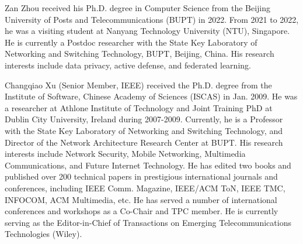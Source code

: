 \documentclass[lettersize,journal]{IEEEtran}
\begin{document}
\newpage


\begin{IEEEbiography}{Zan Zhou} received his Ph.D. degree in Computer Science from the Beijing University of Posts and Telecommunications (BUPT) in 2022. 
From 2021 to 2022, he was a visiting student at Nanyang Technology University (NTU), Singapore. 
He is currently a Postdoc researcher with the State Key Laboratory of Networking and Switching Technology, BUPT, Beijing, China. His research interests include data privacy, active defense, and federated learning. %
\end{IEEEbiography}

\vspace{11pt}

\begin{IEEEbiography}{Changqiao Xu}
(Senior Member, IEEE) received the Ph.D. degree from the Institute of Software, Chinese Academy of Sciences (ISCAS) in Jan. 2009. He was a researcher at Athlone Institute of Technology and Joint Training PhD at Dublin City University, Ireland during 2007-2009. %
Currently, he is a Professor with the State Key Laboratory of Networking and Switching Technology, and Director of the Network Architecture Research Center at BUPT. His research interests include Network Security, Mobile Networking, Multimedia Communications, and Future Internet Technology. He has edited two books and published over 200 technical papers in prestigious international journals and conferences, including IEEE Comm. Magazine, IEEE/ACM ToN, IEEE TMC, INFOCOM, ACM Multimedia, etc. He has served a number of international conferences and workshops as a Co-Chair and TPC member. He is currently serving as the Editor-in-Chief of Transactions on Emerging Telecommunications Technologies (Wiley).
\end{IEEEbiography}
\end{document}
